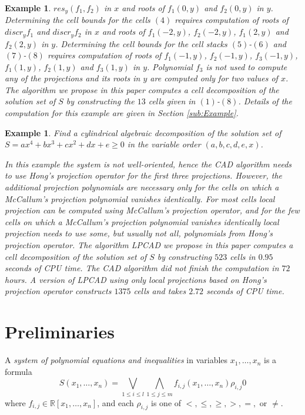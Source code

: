\documentclass[english]{amsart}
\numberwithin{equation}{section}
\numberwithin{figure}{section}
\newtheorem{example}[thm]{Example}
\begin{document}
\begin{example}
$res_{y}(f_{1},f_{2})$ in $x$ and roots of $f_{1}(0,y)$ and $f_{2}(0,y)$
in $y$. Determining the cell bounds for the cells $(4)$ requires
computation of roots of $discr_{y}f_{1}$ and $discr_{y}f_{2}$ in
$x$ and roots of $f_{1}(-2,y)$, $f_{2}(-2,y)$, $f_{1}(2,y)$ and
$f_{2}(2,y)$ in $y$. Determining the cell bounds for the cell stacks
$(5)$-$(6)$ and $(7)$-$(8)$ requires computation of roots of $f_{1}(-1,y)$,
$f_{2}(-1,y)$, $f_{3}(-1,y)$, $f_{1}(1,y)$, $f_{2}(1,y)$ and $f_{3}(1,y)$
in $y$. Polynomial $f_{3}$ is not used to compute any of the projections
and its roots in $y$ are computed only for two values of $x$. The
algorithm we propose in this paper computes a cell decomposition of
the solution set of $S$ by constructing the $13$ cells given in
$(1)$-$(8)$. Details of the computation for this example are given
in Section \ref{sub:Example}.
\end{example}

\begin{example}
Find a cylindrical algebraic decomposition of the solution set of
$S=ax^{4}+bx^{3}+cx^{2}+dx+e\geq0$ in the variable order $(a,b,c,d,e,x)$.

In this example the system is not well-oriented, hence the CAD algorithm
needs to use Hong's projection operator for the first three projections.
However, the additional projection polynomials are necessary only
for the cells on which a McCallum's projection polynomial vanishes
identically. For most cells local projection can be computed using
McCallum's projection operator, and for the few cells on which a McCallum's
projection polynomial vanishes identically local projection needs
to use some, but usually not all, polynomials from Hong's projection
operator. The algorithm LPCAD we propose in this paper computes a
cell decomposition of the solution set of $S$ by constructing $523$
cells in $0.95$ seconds of CPU time. The CAD algorithm did not finish
the computation in $72$ hours. A version of LPCAD using only local
projections based on Hong's projection operator constructs $1375$
cells and takes $2.72$ seconds of CPU time. 
\end{example}

\section{Preliminaries}

A \emph{system of polynomial equations and inequalities} in variables
$x_{1},\ldots,x_{n}$ is a formula\[
S(x_{1},\ldots,x_{n})=\bigvee_{1\leq i\leq l}\bigwedge_{1\leq j\leq m}f_{i,j}(x_{1},\ldots,x_{n})\rho_{i,j}0\]
where $f_{i,j}\in\mathbb{R}[x_{1},\ldots,x_{n}]$, and each $\rho_{i,j}$
is one of $<,\leq,\geq,>,=,$ or $\neq$. 
\end{document}
